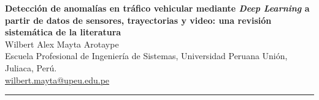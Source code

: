 \documentclass[12pt, a4paper]{article}
\begin{document}

\begin{center}
  {\LARGE\bfseries\color{azulPrincipal}
   Detecci\'{o}n de anomal\'{i}as en tr\'{a}fico vehicular mediante \textit{Deep Learning} a partir de datos de sensores, trayectorias y video: una revisi\'{o}n sistem\'{a}tica de la literatura}\\[1em]

  {\large Wilbert Alex Mayta Arotaype}\\[0.6em]

  {\small
    Escuela Profesional de Ingenier\'{i}a de Sistemas,
    Universidad Peruana Uni\'{o}n, Juliaca, Per\'{u}.\\
    \href{mailto:wilbert.mayta@upeu.edu.pe}{wilbert.mayta@upeu.edu.pe}
  }\\[0.8em]
\end{center}
\noindent\rule{\linewidth}{1pt}

\end{document}

